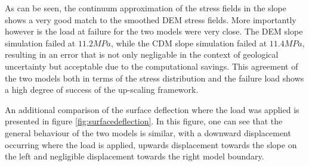 As can be seen, the continuum approximation of the stress fields in the slope shows a very good match to the smoothed DEM stress fields. More importantly however is the load at failure for the two models were very close. The DEM slope simulation failed at $11.2 MPa$, while the CDM slope simulation failed at $11.4 MPa$, resulting in an error that is not only negligable in the context of geological uncertainty but acceptable due to the computational savings. This agreement of the two models both in terms of the stress distribution and the failure load shows a high degree of success of the up-scaling framework. 

An additional comparison of the surface deflection where the load was applied is presented in figure \ref{fig:surfacedeflection}. In this figure, one can see that the general behaviour of the two models is similar, with a downward displacement occurring where the load is applied, upwards displacement towards the slope on the left and negligible displacement towards the right model boundary. 